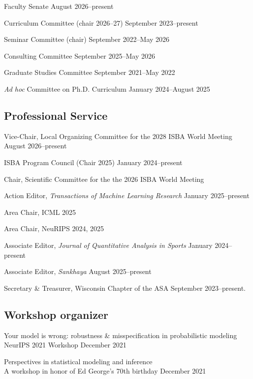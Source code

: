 \documentclass[10pt]{article}
\renewenvironment{itemize}{
  \begin{list}{}{
    \setlength{\leftmargin}{1.5em}
  }
}{
  \end{list}
}
\begin{document}
\begin{itemize}
\item{Faculty Senate \hfill August 2026--present}
\item{Curriculum Committee (chair 2026--27) \hfill September 2023--present}
\item{Seminar Committee (chair) \hfill September 2022--May 2026}
\item{Consulting Committee \hfill September 2025--May 2026}
\item{Graduate Studies Committee \hfill September 2021--May 2022}
\item{\textit{Ad hoc} Committee on Ph.D. Curriculum \hfill January 2024--August 2025}
\end{itemize}

\subsection*{Professional Service}

\begin{itemize}
\item{Vice-Chair, Local Organizing Committee for the 2028 ISBA World Meeting \hfill{August 2026--present}}
\item{ISBA Program Council (Chair 2025) \hfill January 2024--present}
\item{Chair, Scientific Committee for the the 2026 ISBA World Meeting}
\item{Action Editor, \textit{Transactions of Machine Learning Research} \hfill January 2025--present}
\item{Area Chair, ICML \hfill 2025}
\item{Area Chair, NeuRIPS \hfill 2024, 2025}
\item{Associate Editor, \textit{Journal of Quantitative Analysis in Sports} \hfill January 2024--present}
\item{Associate Editor, \textit{Sankhaya} \hfill August 2025--present}
\item{Secretary \& Treasurer, Wisconsin Chapter of the ASA \hfill September 2023--present.}
\end{itemize}

\subsection*{Workshop organizer} 

\begin{itemize}
\item{Your model is wrong: robustness \& misspecification in probabilistic modeling \\
NeurIPS 2021 Workshop \hfill December 2021}
\item{Perspectives in statistical modeling and inference \\
A workshop in honor of Ed George's 70th birthday \hfill December 2021}
\end{itemize}
\end{document}
